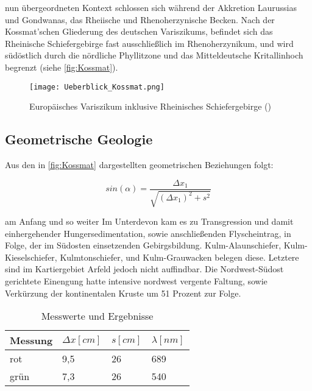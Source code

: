  nun übergeordneten Kontext schlossen sich während der Akkretion Laurussias und Gondwanas, das Rheiische und Rhenoherzynische Becken. Nach der Kossmat'schen Gliederung des deutschen Variszikums, befindet sich das Rheinische Schiefergebirge fast ausschließlich im Rhenoherzynikum, und wird südöstlich durch die nördliche Phyllitzone und das Mitteldeutsche Kritallinhoch begrenzt (siehe \autoref{fig:Kossmat}).

\begin{figure}[!htb]
\centering
\texttt{[image: Ueberblick\_Kossmat.png]}
\caption{Europäisches Variszikum inklusive Rheinisches Schiefergebirge (\cite{franke17})}
\label{fig:Kossmat}
\end{figure} 

\subsection{Geometrische Geologie}
Aus den in \autoref{fig:Kossmat} dargestellten geometrischen Beziehungen folgt:

\begin{equation}
 sin(\alpha)=\frac{\Delta x_1}{\sqrt{(\Delta x_1)^2+s^2}}
 \label{equ:Franke1}
\end{equation}

 am Anfang und so weiter Im Unterdevon kam es zu Transgression und damit einhergehender Hungersedimentation, sowie anschließenden Flyscheintrag, in Folge, der im Südosten einsetzenden Gebirgsbildung. Kulm-Alaunschiefer, Kulm-Kieselschiefer, Kulmtonschiefer, und Kulm-Grauwacken belegen diese. Letztere sind im Kartiergebiet Arfeld jedoch nicht auffindbar. Die Nordwest-Südost gerichtete Einengung hatte intensive nordwest vergente Faltung, sowie Verkürzung der kontinentalen Kruste um 51 Prozent zur Folge. 

\begin{table}[!h]
\centering
\caption{Messwerte und Ergebnisse}
\label{tab:Laser}
\begin{tabular}{@{}llll@{}}
\toprule
{Messung} & {$\Delta x[cm]$} & {$s[cm]$} & {$\lambda[nm]$} \\ \midrule
rot     & 9,5           & 26    & 689          \\
grün    & 7,3         & 26    & 540          \\ \bottomrule
\end{tabular}
\end{table}



